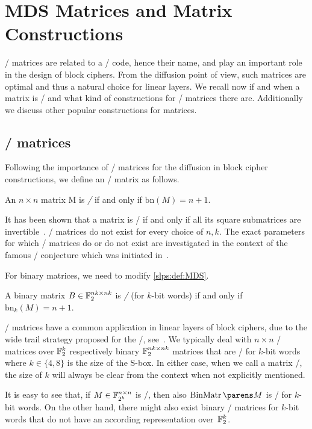\section{MDS Matrices and Matrix Constructions}
\label{slps:sec:prelims}

\MDS/ matrices are related to a \MDSl/ code, hence their name, and  play an important role in the design of block ciphers.
From the diffusion point of view, such matrices are optimal and thus a natural choice for linear layers.
We recall now if and when a matrix is \MDS/ and what kind of constructions for \MDS/ matrices there are.
Additionally we discuss other popular constructions for matrices.

\subsection{\MDS/ matrices}
\label{slps:subsec:prelim1}

Following the importance of \MDS/ matrices for the diffusion in block cipher constructions, we define an \MDS/ matrix as follows.
\begin{definition}
\label{slps:def:MDS}
    An $n \times n$ matrix M is \emph{\MDSf/} if and only if $\mathrm{bn}(M) = n+1$.
\end{definition}
It has been shown that a matrix is \MDS/ if and only if all its square submatrices are invertible~\cite[page 321, Theorem 8]{error_correcting_codes}.
\MDS/ matrices do not exist for every choice of $n,k$.
The exact parameters for which \MDS/ matrices do or do not exist are investigated in the context of the famous \MDS/ conjecture which was initiated in~\cite{Segre1955}.

For binary matrices, we need to modify \cref{slps:def:MDS}.
\begin{definition}
    A binary matrix $B \in \mathbb{F}_2^{nk \times nk}$ is \emph{\MDS/} (for $k$-bit words) if and only if $\mathrm{bn}_k(M) = n+1$.
\end{definition}
\MDS/ matrices have a common application in linear layers of block ciphers, due to the wide trail strategy proposed for the \AES/, see~\cite{PhD:Daemen95,rijndael_book}.
We typically deal with $n \times n$ \MDS/ matrices over $\mathbb{F}_2^k$ respectively binary $\mathbb{F}_2^{nk \times nk}$ matrices that are \MDS/ for $k$-bit words where $k \in \{4,8\}$ is the size of the S-box.
In either case, when we call a matrix \MDS/, the size of $k$ will always be clear from the context when not explicitly mentioned.

It is easy to see that, if $M \in \mathbb{F}_{2^k}^{n \times n}$ is \MDS/, then also $\binarymatrix{M}$ is \MDS/ for $k$-bit words.
On the other hand, there might also exist binary \MDS/ matrices for $k$-bit words that do not have an according representation over~$\mathbb{F}_2^k$.

